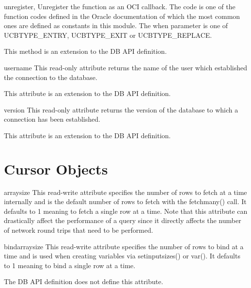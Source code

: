 \documentclass{manual}
\begin{document}
\begin{funcdesc}{unregister}{, }
  Unregister the function as an OCI callback. The code is one of the function
  codes defined in the Oracle documentation of which the most common ones are
  defined as constants in this module. The when parameter is one of
  UCBTYPE_ENTRY, UCBTYPE_EXIT or UCBTYPE_REPLACE.

   This method is an extension to the DB API definition.
\end{funcdesc}

\begin{datadesc}{username}
  This read-only attribute returns the name of the user which established the
  connection to the database.

   This attribute is an extension to the DB API definition.
\end{datadesc}

\begin{datadesc}{version}
  This read-only attribute returns the version of the database to which a
  connection has been established.

   This attribute is an extension to the DB API definition.
\end{datadesc}

\chapter{Cursor Objects\label{cursorobj}}

\begin{datadesc}{arraysize}
  This read-write attribute specifies the number of rows to fetch at a time
  internally and is the default number of rows to fetch with the fetchmany()
  call. It defaults to 1 meaning to fetch a single row at a time. Note that
  this attribute can drastically affect the performance of a query since it
  directly affects the number of network round trips that need to be performed.
\end{datadesc}

\begin{datadesc}{bindarraysize}
  This read-write attribute specifies the number of rows to bind at a time and
  is used when creating variables via setinputsizes() or var(). It defaults to
  1 meaning to bind a single row at a time.

   The DB API definition does not define this attribute.
\end{datadesc}
\end{document}
